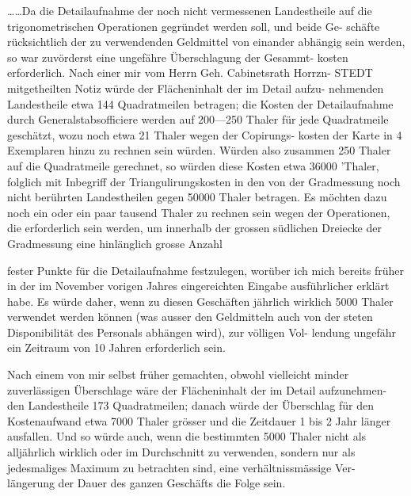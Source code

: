 \documentclass[12pt,a4paper]{article}
\theoremstyle{plain}
\theoremstyle{definition}
\theoremstyle{remark}
\begin{document}
\noindent
\ldots\ldots Da die Detailaufnahme der noch nicht vermessenen Landestheile
auf die trigonometrischen Operationen gegründet werden soll, und beide Ge-
schäfte rücksichtlich der zu verwendenden Geldmittel von einander abhängig
sein werden, so war zuvörderst eine ungefähre Überschlagung der Gesammt-
kosten erforderlich. Nach einer mir vom Herrn Geh. Cabinetsrath Horrzn-
STEDT mitgetheilten Notiz würde der Flächeninhalt der im Detail aufzu-
nehmenden Landestheile etwa 144 Quadratmeilen betragen; die Kosten der
Detailaufnahme durch Generalstabsofficiere werden auf 200---250 Thaler für
jede Quadratmeile geschätzt, wozu noch etwa 21 Thaler wegen der Copirungs-
kosten der Karte in 4 Exemplaren hinzu zu rechnen sein würden. Würden also
zusammen 250 Thaler auf die Quadratmeile gerechnet, so würden diese Kosten
etwa 36000 'Thaler, folglich mit Inbegriff der Triangulirungskosten in den
von der Gradmessung noch nicht berührten Landestheilen gegen 50000 Thaler
betragen. Es möchten dazu noch ein oder ein paar tausend Thaler zu rechnen
sein wegen der Operationen, die erforderlich sein werden, um innerhalb der
grossen südlichen Dreiecke der Gradmessung eine hinlänglich grosse Anzahl

\noindent

\noindent
fester Punkte für die Detailaufnahme festzulegen, worüber ich mich bereits
früher in der im November vorigen Jahres eingereichten Eingabe ausführlicher
erklärt habe. Es würde daher, wenn zu diesen Geschäften jährlich wirklich
5000 Thaler verwendet werden können (was ausser den Geldmitteln auch
von der steten Disponibilität des Personals abhängen wird), zur völligen Vol-
lendung ungefähr ein Zeitraum von 10 Jahren erforderlich sein.

\noindent
Nach einem von mir selbst früher gemachten, obwohl vielleicht minder
zuverlässigen Überschlage wäre der Flächeninhalt der im Detail aufzunehmen-
den Landestheile 173 Quadratmeilen; danach würde der Überschlag für den
Kostenaufwand etwa 7000 Thaler grösser und die Zeitdauer 1 bis 2 Jahr
länger ausfallen. Und so würde auch, wenn die bestimmten 5000 Thaler
nicht als alljährlich wirklich oder im Durchschnitt zu verwenden, sondern nur
als jedesmaliges Maximum zu betrachten sind, eine verhältnissmässige Ver-
längerung der Dauer des ganzen Geschäfts die Folge sein.
\end{document}
